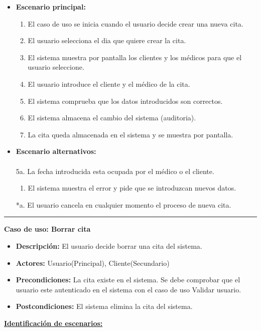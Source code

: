 \begin{itemize}\renewcommand{\labelitemi}{$\circ$}
 \item \textbf{Escenario principal:}
         \begin{enumerate}
          \item El caso de uso se inicia cuando el usuario decide crear una nueva cita.
          \item El usuario selecciona el dia que quiere crear la cita.
	  \item El sistema muestra por pantalla los clientes y los médicos para que el usuario seleccione.
	  \item El usuario introduce el cliente y el médico de la cita.
          \item El sistema comprueba que los datos introducidos son correctos.
 	  \item El sistema almacena el cambio del sistema (auditoria).
          \item La cita queda almacenada en el sistema y se muestra por pantalla.
         \end{enumerate}
  \item \textbf{Escenario alternativos:}\\\\
	5a. La fecha introducida esta ocupada por el médico o el cliente.
		\begin{enumerate}
		 \item El sistema muestra el error y pide que se introduzcan nuevos datos.
		\end{enumerate}
          *a. El usuario cancela en cualquier momento el proceso de nueva cita.
\end{itemize}
\smallskip
\hrule height 1pt
\smallskip
\textbf{Caso de uso: Borrar cita}
\begin{itemize}\renewcommand{\labelitemi}{$\cdot$}
 \item \textbf{Descripción:} El usuario decide borrar una cita del sistema.
  \item \textbf{Actores:} Usuario(Principal), Cliente(Secundario)
  \item \textbf{Precondiciones:} La cita existe en el sistema. Se debe comprobar que el usuario este autenticado en el sistema con el caso de uso Validar usuario.
  \item \textbf{Postcondiciones:} El sistema elimina la cita del sistema.
\end{itemize}
\underline{\textbf{Identificación de escenarios:}}
